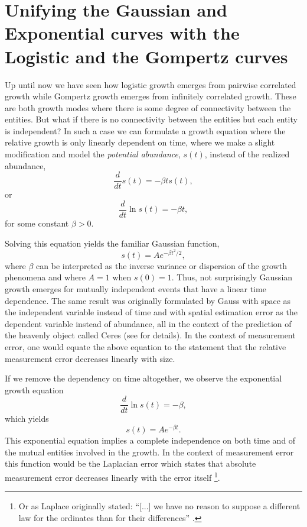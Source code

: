 \documentclass{article}
\begin{document}
\section{Unifying the Gaussian and Exponential curves with the Logistic and the Gompertz curves}

Up until now we have seen how logistic growth emerges from pairwise correlated growth while Gompertz growth emerges from infinitely correlated growth. These are both growth modes where there is some degree of connectivity between the entities. But what if there is no connectivity between the entities but each entity is independent? In such a case we can formulate a growth equation where the relative growth is only linearly dependent on time, where we make a slight modification and model the \textit{potential abundance}, $s(t)$, instead of the realized abundance,
\begin{equation}
  \frac{d}{dt}s(t) = - \beta t s(t),
\end{equation}
or 
\begin{equation}
  \frac{d}{dt}\ln s(t) = - \beta t,
\end{equation}
for some constant $\beta>0$. 
 
Solving this equation yields the familiar Gaussian function, 
\begin{equation}
  s(t) = A e^{ - \beta t^2 / 2},
\end{equation}
where $\beta$ can be interpreted as the inverse variance or dispersion of the growth phenomena and where $A=1$ when $s(0)=1$. Thus, not surprisingly Gaussian growth emerges for mutually independent events that have a linear time dependence. The same result was originally formulated by Gauss with space as the independent variable instead of time and with spatial estimation error as the dependent variable instead of abundance, all in the context of the prediction of the heavenly object called Ceres \cite{gauss1857theory} (see \cite{stahl2006evolution} for details). In the context of measurement error, one would equate the above equation to the statement that the relative measurement error decreases linearly with size. 

If we remove the dependency on time altogether, we observe the exponential growth equation
\begin{equation}
  \frac{d}{dt}\ln s(t) = - \beta,
\end{equation}
which yields 
\begin{equation}
  s(t) = A e^{ - \beta t}.
\end{equation}
This exponential equation implies a complete independence on both time and of the mutual entities involved in the growth. In the context of measurement error this function would be the Laplacian error which states that absolute measurement error decreases linearly with the error itself \footnote{Or as Laplace originally stated: ``[...] we have no reason to suppose a different law for the ordinates than for their differences'' \cite{stahl2006evolution}.}. 
\end{document}
